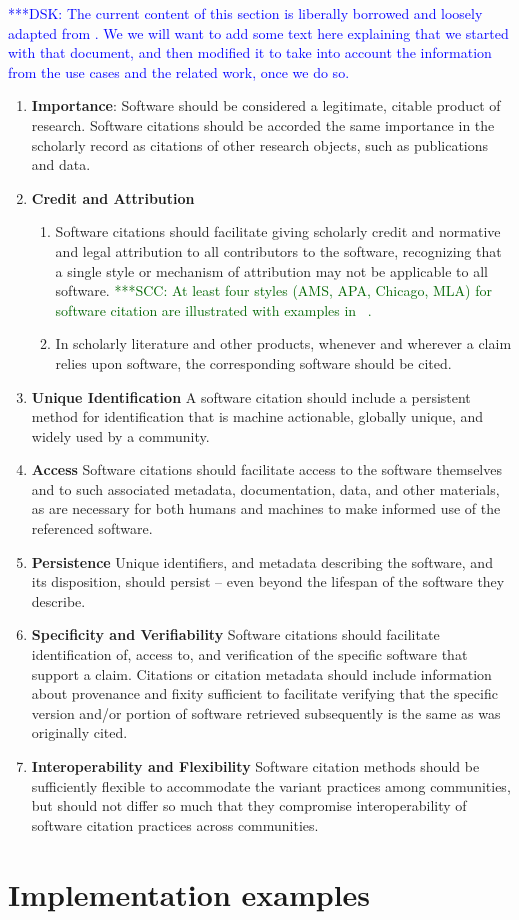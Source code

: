 \documentclass[11pt, oneside]{amsart}
\newcommand{\katznote}[1]{ {\textcolor{blue} { ***DSK: #1 }}}
\newcommand{\scnote}[1]{ {\textcolor{darkgreen} { ***SCC: #1 }}} %
\begin{document}
\katznote{The current content of this section is liberally borrowed and loosely adapted from \cite{data-citation-principles}.  We we will want to add some text here explaining that we started with that document, and then modified it to take into account the information from the use cases and the related work, once we do so.}

\begin{enumerate}
\item \textbf{Importance}:
Software should be considered a legitimate, citable product of research. Software citations should be accorded the same importance in the scholarly record as citations of other research objects, such as publications and data.
\item \textbf{Credit and Attribution}
\begin{enumerate}
\item Software citations should facilitate giving scholarly credit and normative and legal attribution to all contributors to the software, recognizing that a single style or mechanism of attribution may not be applicable to all software.\scnote{At least four styles (AMS, APA, Chicago, MLA) for software citation are illustrated with examples in ~\cite{lipson2011cite}.}
\item In scholarly literature and other products, whenever and wherever a claim relies upon software, the corresponding software should be cited.
\end{enumerate}
\item \textbf{Unique Identification}
A software citation should include a persistent method for identification that is machine actionable, globally unique, and widely used by a community.
\item \textbf{Access}
Software citations should facilitate access to the software themselves and to such associated metadata, documentation, data, and other materials, as are necessary for both humans and machines to make informed use of the referenced software.
\item \textbf{Persistence}
Unique identifiers, and metadata describing the software, and its disposition, should persist -- even beyond the lifespan of the software they describe.
\item \textbf{Specificity and Verifiability}
Software citations should facilitate identification of, access to, and verification of the specific software that support a claim. Citations or citation metadata should include information about provenance and fixity sufficient to facilitate verifying that the specific version and/or portion of software retrieved subsequently is the same as was originally cited.
\item \textbf{Interoperability and Flexibility}
Software citation methods should be sufficiently flexible to accommodate the variant practices among communities, but should not differ so much that they compromise interoperability of software citation practices across communities.
\end{enumerate}


\section{Implementation examples}
\label{sec:examples}



\end{document}
